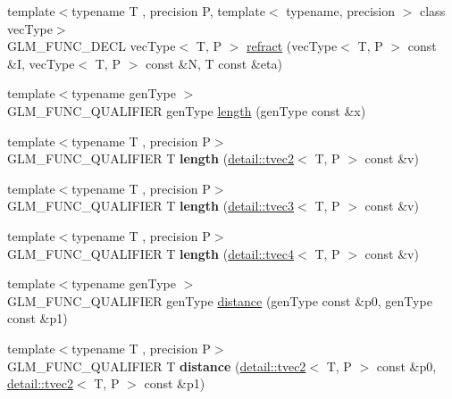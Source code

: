 \begin{DoxyCompactItemize}
\item 
{\footnotesize template$<$typename T , precision P, template$<$ typename, precision $>$ class vec\-Type$>$ }\\G\-L\-M\-\_\-\-F\-U\-N\-C\-\_\-\-D\-E\-C\-L vec\-Type$<$ T, P $>$ \hyperlink{group__core__func__geometric_ga99d8ddb244b129892babaca9778206d0}{refract} (vec\-Type$<$ T, P $>$ const \&I, vec\-Type$<$ T, P $>$ const \&N, T const \&eta)
\item 
{\footnotesize template$<$typename gen\-Type $>$ }\\G\-L\-M\-\_\-\-F\-U\-N\-C\-\_\-\-Q\-U\-A\-L\-I\-F\-I\-E\-R gen\-Type \hyperlink{group__core__func__geometric_ga03b2831439defb8922832b540b91b8a7}{length} (gen\-Type const \&x)
\item 
\hypertarget{namespaceglm_a2b1957c9c773e5f63c0e843c732000a3}{{\footnotesize template$<$typename T , precision P$>$ }\\G\-L\-M\-\_\-\-F\-U\-N\-C\-\_\-\-Q\-U\-A\-L\-I\-F\-I\-E\-R T {\bfseries length} (\hyperlink{structglm_1_1detail_1_1tvec2}{detail\-::tvec2}$<$ T, P $>$ const \&v)}\label{namespaceglm_a2b1957c9c773e5f63c0e843c732000a3}

\item 
\hypertarget{namespaceglm_a9b77c44ed4ba8ed4842e50ae90676aa8}{{\footnotesize template$<$typename T , precision P$>$ }\\G\-L\-M\-\_\-\-F\-U\-N\-C\-\_\-\-Q\-U\-A\-L\-I\-F\-I\-E\-R T {\bfseries length} (\hyperlink{structglm_1_1detail_1_1tvec3}{detail\-::tvec3}$<$ T, P $>$ const \&v)}\label{namespaceglm_a9b77c44ed4ba8ed4842e50ae90676aa8}

\item 
\hypertarget{namespaceglm_a10caf4973f213ff24dd3d103d8756562}{{\footnotesize template$<$typename T , precision P$>$ }\\G\-L\-M\-\_\-\-F\-U\-N\-C\-\_\-\-Q\-U\-A\-L\-I\-F\-I\-E\-R T {\bfseries length} (\hyperlink{structglm_1_1detail_1_1tvec4}{detail\-::tvec4}$<$ T, P $>$ const \&v)}\label{namespaceglm_a10caf4973f213ff24dd3d103d8756562}

\item 
{\footnotesize template$<$typename gen\-Type $>$ }\\G\-L\-M\-\_\-\-F\-U\-N\-C\-\_\-\-Q\-U\-A\-L\-I\-F\-I\-E\-R gen\-Type \hyperlink{group__core__func__geometric_ga00716eae37e8ae2a76ca7799f9c75682}{distance} (gen\-Type const \&p0, gen\-Type const \&p1)
\item 
\hypertarget{namespaceglm_a7ad95124e1674eaaffae23b7988de4ee}{{\footnotesize template$<$typename T , precision P$>$ }\\G\-L\-M\-\_\-\-F\-U\-N\-C\-\_\-\-Q\-U\-A\-L\-I\-F\-I\-E\-R T {\bfseries distance} (\hyperlink{structglm_1_1detail_1_1tvec2}{detail\-::tvec2}$<$ T, P $>$ const \&p0, \hyperlink{structglm_1_1detail_1_1tvec2}{detail\-::tvec2}$<$ T, P $>$ const \&p1)}\label{namespaceglm_a7ad95124e1674eaaffae23b7988de4ee}


\end{DoxyCompactItemize}

